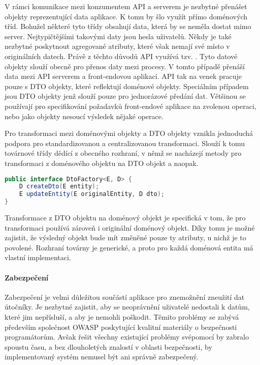 			V rámci komunikace mezi konzumentem \ac{API} a serverem je nezbytné přenášet objekty reprezentující data
			aplikace.
			K tomu by šlo využít přímo doménových tříd.
			Bohužel některé tyto třídy obsahují data, která by se neměla dostat mimo server.
			Nejtypičtějšími takovými daty jsou hesla uživatelů.
			Někdy je také nezbytné poskytnout agregované atributy, které však nemají své místo v originálních datech.
			Právě z těchto důvodů \ac{API} využívá tzv. .
			Tyto datové objekty slouží obecně pro přenos daty mezi procesy.
			V tomto případě přenáší data mezi \ac{API} serverem a front-endovou aplikací.
			\ac{API} tak na venek pracuje pouze s \ac{DTO} objekty, které reflektují doménové objekty.
			Speciálním případem jsou \ac{DTO} objekty jenž slouží pouze pro jednorázové předání dat.
			Většinou se používají pro specifikování požadavků front-endové aplikace na zvolenou operaci, nebo jako
			objekty nesoucí výsledek nějaké operace.

			Pro transformaci mezi doménovými objekty a \ac{DTO} objekty vznikla jednoduchá podpora pro standardizovanou
			a centralizovanou transformaci.
			Slouží k tomu továrnové třídy dědící z obecného rozhraní, v němž se nacházejí metody pro transformaci z doménového
			objektu na \ac{DTO} objekt a naopak.

			\begin{lstlisting}[language=Java, caption={Ukázka obecného rozhraní třídy pro transformaci mezi doménovými a DTO objekty. Zdroj: [autor]}]
public interface DtoFactory<E, D> {
    D createDto(E entity);
    E updateEntity(E originalEntity, D dto);
}
			\end{lstlisting}

			Transformace z \ac{DTO} objektu na doménový objekt je specifická v tom, že pro transformaci používá zároveň
			i originální doménový objekt.
			Díky tomu je možné zajistit, že výsledný objekt bude mít změněné pouze ty atributy, u nichž je to povolené.
			Rozhraní továrny je generické, a proto pro každá doménová entita má vlastní implementaci.

			\paragraph{Zabezpečení}

			Zabezpečení je velmi důležitou součástí aplikace pro znemožnění zneužití dat útočníky.
			Je nezbytné zajistit, aby se neoprávnění uživatelé nedostali k datům, které jim nepřísluší, a aby je nemohli
			poškodit.
			Těmito problémy se zabývá především společnost OWASP poskytující kvalitní materiály o bezpečnosti programátorům.
			Avšak řešit všechny existující problémy svépomocí by zabralo spoustu času, a bez dlouholetých znalostí v
			oblasti bezpečnosti, by implementovaný systém nemusel být ani správně zabezpečený.

